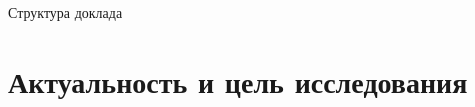 \documentclass[aspectratio=169,12pt]{beamer}
\begin{document}
\begin{frame}{Структура доклада}
  \tableofcontents[subsectionstyle=hide]
\end{frame}

\section{Актуальность и цель исследования}

\end{document}
